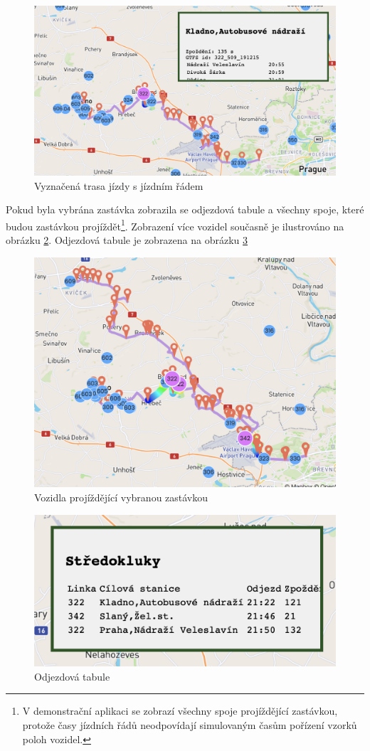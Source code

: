 \begin{figure}
	\centering
  \includegraphics[width=0.7\linewidth]{../img/kladno_aut_322.png}
  \caption{Vyznačená trasa jízdy s jízdním řádem}
  \label{fig:kladno_aut_322}
\end{figure}

\bigbreak

Pokud byla vybrána zastávka zobrazila se odjezdová tabule a všechny spoje, které budou zastávkou projíždět\footnote{V demonstrační aplikaci se zobrazí všechny spoje projíždějící zastávkou, protože časy jízdních řádů neodpovídají simulovaným časům pořízení vzorků poloh vozidel.}. Zobrazení více vozidel současně je ilustrováno na obrázku \ref{fig:more_trips}. Odjezdová tabule je zobrazena na obrázku \ref{fig:stredokluky_table}

\begin{figure}
	\centering
  \includegraphics[width=0.7\linewidth]{../img/more_trips.png}
  \caption{Vozidla projíždějící vybranou zastávkou}
  \label{fig:more_trips}
\end{figure}

\begin{figure}
	\centering
  \includegraphics[width=0.4\linewidth]{../img/stredokluky_table.png}
  \caption{Odjezdová tabule}
  \label{fig:stredokluky_table}
\end{figure}

